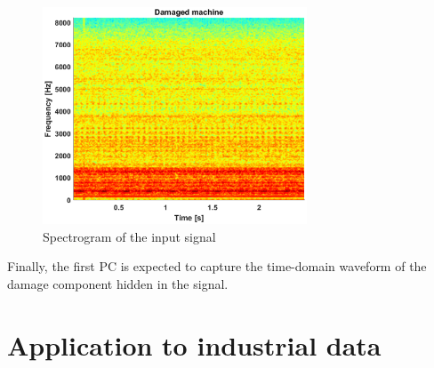 \documentclass[10pt]{article}
\begin{document}
\begin{figure}[ht!]
\centering
\includegraphics[width=0.7\textwidth]{wykresy/spec.eps}
\caption{Spectrogram of the input signal}
\label{fig:spec}
\end{figure}

Finally, the first PC is expected to capture the time-domain waveform of the damage component hidden in the signal.

\section{Application to industrial data}
\end{document}
